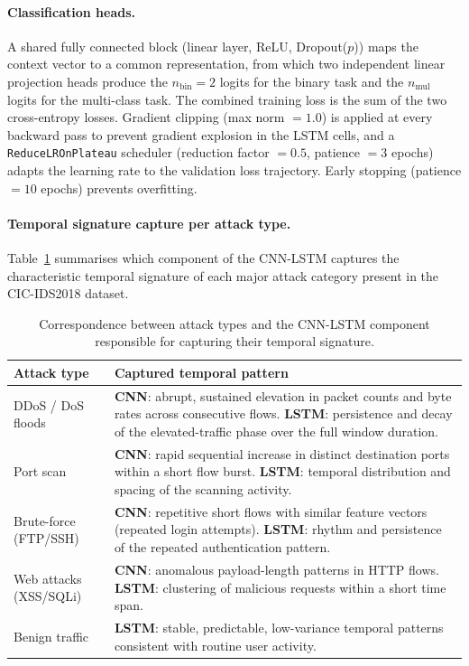 \documentclass[../main.tex]{subfiles}
\begin{document}
\paragraph{Classification heads.}
A shared fully connected block (linear layer, ReLU, Dropout($p$)) maps the context vector to a common representation, from which two independent linear projection heads produce the $n_{\text{bin}} = 2$ logits for the binary task and the $n_{\text{mul}}$ logits for the multi-class task.  The combined training loss is the sum of the two cross-entropy losses.  Gradient clipping (max norm $= 1.0$) is applied at every backward pass to prevent gradient explosion in the LSTM cells, and a \texttt{ReduceLROnPlateau} scheduler (reduction factor $= 0.5$, patience $= 3$ epochs) adapts the learning rate to the validation loss trajectory.  Early stopping (patience $= 10$ epochs) prevents overfitting.

\paragraph{Temporal signature capture per attack type.}
Table~\ref{tab:cnn-lstm-attack-patterns} summarises which component of the CNN-LSTM captures the characteristic temporal signature of each major attack category present in the CIC-IDS2018 dataset.

\begin{table}[H]
\centering
\caption{Correspondence between attack types and the CNN-LSTM component responsible for capturing their temporal signature.}
\label{tab:cnn-lstm-attack-patterns}
\small
\begin{tabular}{lp{8cm}}
\toprule
\textbf{Attack type}   & \textbf{Captured temporal pattern} \\
\midrule
DDoS / DoS floods      & \textbf{CNN}: abrupt, sustained elevation in packet counts and byte rates across consecutive flows. \textbf{LSTM}: persistence and decay of the elevated-traffic phase over the full window duration. \\
Port scan              & \textbf{CNN}: rapid sequential increase in distinct destination ports within a short flow burst. \textbf{LSTM}: temporal distribution and spacing of the scanning activity. \\
Brute-force (FTP/SSH)  & \textbf{CNN}: repetitive short flows with similar feature vectors (repeated login attempts). \textbf{LSTM}: rhythm and persistence of the repeated authentication pattern. \\
Web attacks (XSS/SQLi) & \textbf{CNN}: anomalous payload-length patterns in HTTP flows. \textbf{LSTM}: clustering of malicious requests within a short time span. \\
Benign traffic         & \textbf{LSTM}: stable, predictable, low-variance temporal patterns consistent with routine user activity. \\
\bottomrule
\end{tabular}
\end{table}
\end{document}

